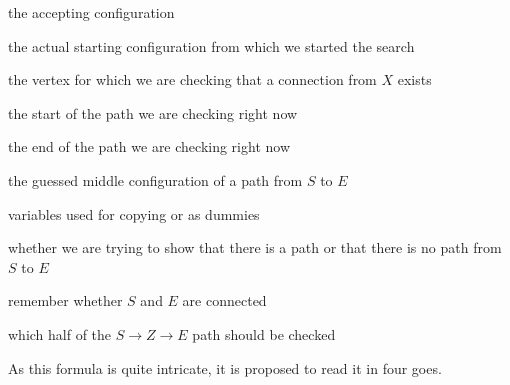 \begin{description}
    \setlength\itemsep{0.2em}
    \item[$Y$:] the accepting configuration
    \item[$X$:] the actual starting configuration from which we started the search
    \item[$I$:] the vertex for which we are checking that a connection from $X$ exists
    \item[$S$:] the start of the path we are checking right now
    \item[$E$:] the end of the path we are checking right now
    \item[$Z, Z_{e}$:] the guessed middle configuration of a path from $S$ to $E$
    \item[$A, B, b_{0}$:] variables used for copying or as dummies
    \item[$b_{path}$:] whether we are trying to show that there is a path or that there is no path from $S$ to $E$
    \item[$b_{1}$:] remember whether $S$ and $E$ are connected
    \item[$b_{2}, b_{2e}$:] which half of the $S \to Z \to E$ path should be checked
\end{description}
As this formula is quite intricate, it is proposed to read it in four goes.
